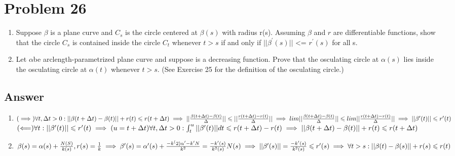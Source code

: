 \documentclass[
	12pt, %
]{fphw}
\theoremstyle{plain}
\begin{document}
\section*{Problem 26}
\begin{problem}
     \begin{enumerate}
          \item Suppose $\beta$ is a plane curve and $C_{s}$ is the circle centered at $\beta(s)$ with radius r(s). Assuming $\beta$ and
          $r$ are differentiable functions, show that the circle $C_{s}$ is contained inside the circle $C_{t}$ whenever
          $t > s$ if and only if $||\beta^{'}(s)||$ <= $r^{'}(s)$ for all s.
          \item Let $\alpha$be arclength-parametrized plane curve and suppose is a decreasing function. Prove that the
          osculating circle at $\alpha(s)$ lies inside the osculating circle at $\alpha(t)$ whenever $t > s$. (See Exercise 25
          for the definition of the osculating circle.)
     \end{enumerate}
\end{problem}
\subsection*{Answer}
\begin{enumerate}
     \item$(\implies) \forall t,\Delta t > 0: ||\beta(t + \Delta t) - \beta(t)|| + r(t) \leqslant r(t + \Delta t)\\  \\ \implies||\frac{\beta(t + \Delta t) - \beta(t)}{\Delta}||\leqslant||\frac{r(t + \Delta t) -r(t)}{\Delta}|| \implies lim||\frac{\beta(t + \Delta t) - \beta(t)}{\Delta}||\leqslant lim||\frac{r(t + \Delta t) -r(t)}{\Delta}||\\  \\ \implies||\beta'(t)||\leqslant r'(t)\\  \\$
     $(\Longleftarrow)\forall t: ||\beta'(t)|| \leqslant r'(t)\\  \\ \implies (u = t+\Delta t)\forall t,\Delta t > 0 : \int_t^u ||\beta'(t)||dt \leqslant r(t +\Delta t) - r(t)\\  \\ \implies  ||\beta(t + \Delta t) - \beta(t)|| + r(t) \leqslant r(t + \Delta t)$
     \item $\beta(s) = \alpha(s) + \frac{N(S)}{k(s)} , r(s) = \frac{1}{k}\\  \\ \implies \beta'(s) = \alpha'(s) + \frac{-k^(2)\alpha' - k'N}{k^2} = \frac{-k'(s)}{k^2(s)}N(s)\\  \\ \implies ||\beta'(s)|| = \frac{-k'(s)}{k^2(s)} \leqslant r'(s)\\  \\ \implies \forall t > s:\\  \\ ||\beta(t) - \beta(s)|| + r(s) \leqslant r(t)$
\end{enumerate}
\end{document}
